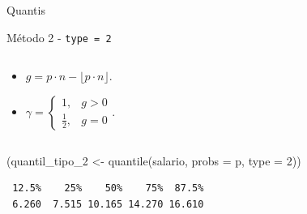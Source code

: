 \documentclass[
  10pt,
  ignorenonframetext,
]{beamer}
\newenvironment{Shaded}{\begin{snugshade}}{\end{snugshade}}
\newcommand{\AttributeTok}[1]{\textcolor[rgb]{0.40,0.45,0.13}{#1}}
\newcommand{\DecValTok}[1]{\textcolor[rgb]{0.68,0.00,0.00}{#1}}
\newcommand{\FunctionTok}[1]{\textcolor[rgb]{0.28,0.35,0.67}{#1}}
\newcommand{\NormalTok}[1]{\textcolor[rgb]{0.00,0.23,0.31}{#1}}
\newcommand{\OtherTok}[1]{\textcolor[rgb]{0.00,0.23,0.31}{#1}}
\providecommand{\tightlist}{%
  \setlength{\itemsep}{0pt}\setlength{\parskip}{0pt}}\usepackage{longtable,booktabs,array}
\begin{document}
\begin{frame}[fragile]{Quantis}
\begin{block}{Método 2 - \texttt{type\ =\ 2}}
\begin{columns}[T]
\begin{column}{0.5\textwidth}
\begin{itemize}
\tightlist
\item
  \(g = p\cdot n - \lfloor p\cdot n \rfloor\).
\item
  \(\gamma = \begin{cases} 1,& g> 0\\ \frac{1}{2},& g = 0 \end{cases}.\)
\end{itemize}
\end{column}
\end{columns}

\begin{Shaded}
\begin{Highlighting}[]
\NormalTok{(quantil\_tipo\_2 }\OtherTok{\textless{}{-}} \FunctionTok{quantile}\NormalTok{(salario, }\AttributeTok{probs =}\NormalTok{ p, }\AttributeTok{type =} \DecValTok{2}\NormalTok{))}
\end{Highlighting}
\end{Shaded}

\begin{verbatim}
 12.5%    25%    50%    75%  87.5% 
 6.260  7.515 10.165 14.270 16.610 
\end{verbatim}
\end{block}
\end{frame}
\end{document}
